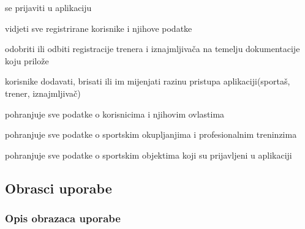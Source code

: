 \begin{packed_enum}
\begin{packed_enum}
					\item se prijaviti u aplikaciju
					\item vidjeti sve registrirane korisnike i njihove podatke
					\item odobriti ili odbiti registracije trenera i iznajmljivača na temelju dokumentacije koju prilože
					\item korisnike dodavati, brisati ili im mijenjati razinu pristupa aplikaciji(sportaš, trener, iznajmljivač)
				
				\end{packed_enum}
			
				\item {}
				
				\begin{packed_enum}
					
					\item pohranjuje sve podatke o korisnicima i njihovim ovlastima
					\item pohranjuje sve podatke o sportskim okupljanjima i profesionalnim treninzima
					\item pohranjuje sve podatke o sportskim objektima koji su prijavljeni u aplikaciji
					
				\end{packed_enum}
			
			\end{packed_enum}
			
			\eject 
			
			
				
			\subsection{Obrasci uporabe}
				
				
				\subsubsection{Opis obrazaca uporabe}

